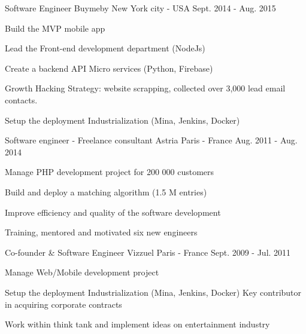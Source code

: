 \begin{cventries}
  \cventry
    {Software Engineer} %
    {Buymeby} %
    {New York city - USA} %
    {Sept. 2014 - Aug. 2015} %
    {
      \begin{cvitems} %
        \item {Build the MVP mobile app}
        \item {Lead the Front-end development department (NodeJs)}
        \item {Create a backend API Micro services (Python, Firebase)}
        \item {Growth Hacking Strategy: website scrapping, collected over 3,000 lead email contacts.}
        \item {Setup the deployment Industrialization (Mina, Jenkins, Docker)}
      \end{cvitems}
    }

  \cventry
    {Software engineer - Freelance consultant} %
    {Astria} %
    {Paris - France} %
    {Aug. 2011 - Aug. 2014} %
    {
      \begin{cvitems} %
        \item {Manage PHP development project for 200 000 customers}
        \item {Build and deploy a matching algorithm (1.5 M entries)}
        \item {Improve efficiency and quality of the software development}
        \item {Training, mentored and motivated six new engineers}
      \end{cvitems}
    }

  \cventry
    {Co-founder \& Software Engineer} %
    {Vizzuel} %
    {Paris - France} %
    {Sept. 2009 - Jul. 2011} %
    {
      \begin{cvitems} %
        \item {Manage Web/Mobile development project}
        \item {Setup the deployment Industrialization (Mina, Jenkins, Docker) Key contributor in acquiring corporate contracts}
        \item {Work within think tank and implement ideas on entertainment industry}
      \end{cvitems}
    }

\end{cventries}
